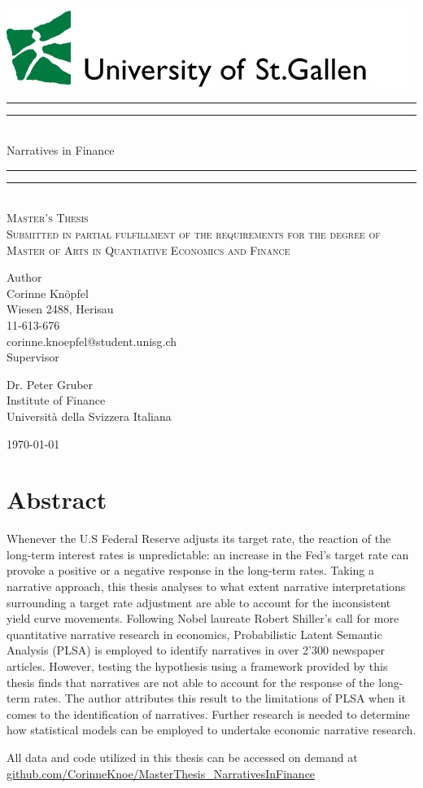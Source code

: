\documentclass[11pt,a4paper,english,oneside]{book}
\makeatletter
\newcommand{\githubSymbol}{\faGithub}
\newcommand\link[2]{\color{black}\href{#1}{#2}\color{black} }
\newcommand*{\github}[1]{\sociallink{\githubSymbol}{https://www.github.com/#1}{github.com/#1}}
\newcommand{\sociallink}[3]{\mbox{\textcolor{black}{#1}\hspace{0.5em}\link{#2}{#3}\hspace{1em}}}
\newcommand*{\plogo}{\includegraphics[scale=0.7]{Images/HSG_logo}}
\numberwithin{equation}{chapter}
\newcommand*{\titleGP}{\begingroup %
\centering %
\vspace*{\baselineskip} %
\plogo\\[2\baselineskip] %
\rule{\textwidth}{1.6pt}\vspace*{-\baselineskip}\vspace*{2pt} %
\rule{\textwidth}{0.4pt}\\[\baselineskip] %
{\LARGE Narratives in Finance }\\[0.2\baselineskip] %
\rule{\textwidth}{0.4pt}\vspace*{-\baselineskip}\vspace{3.2pt} %
\rule{\textwidth}{1.6pt}\\[2\baselineskip] %
\scshape %
Master's Thesis\\[2\baselineskip]
Submitted in partial fulfillment of the requirements for the degree of Master of Arts in Quantiative Economics and Finance \par
\vspace*{2\baselineskip}
Author\\
{\Large Corinne Knöpfel \\ [5pt]
 }
Wiesen 2488, Herisau \\[5pt]
11-613-676\\[5pt]
corinne.knoepfel@student.unisg.ch \\


\vspace*{2\baselineskip}
Supervisor\\
{\Large Dr. Peter Gruber\\[5pt]%
\small Institute of Finance\\[5pt]Universit\`{a} della Svizzera Italiana\par}
\vfill
{\scshape %
	\today } \\[0.3\baselineskip]
\endgroup}
\makeatother
\begin{document}
\thispagestyle{empty}
\titleGP
\newpage
\doublespacing
\setcounter{page}{1}
\thispagestyle{firststyle}


\chapter*{Abstract}
Whenever the U.S Federal Reserve adjusts its target rate, the reaction of the long-term interest rates is unpredictable: an increase in the Fed's target rate can provoke a positive or a negative response in the long-term rates. Taking a narrative approach, this thesis analyses to what extent narrative interpretations surrounding a target rate adjustment are able to account for the inconsistent yield curve movements. 
Following Nobel laureate Robert Shiller's call for more quantitative narrative research in economics, Probabilistic Latent Semantic Analysis (PLSA) is employed to identify narratives in over 2'300 newspaper articles. However, testing the hypothesis using a framework provided by \citet{Ellingsen.2003} this thesis finds that narratives are not able to account for the response of the long-term rates. The author attributes this result to the limitations of PLSA when it comes to the identification of narratives. Further research is needed to determine how statistical models can be employed to undertake economic narrative research. 

\vspace*{\fill}

All data and code utilized in this thesis can be accessed on demand at\\
\noindent \github{CorinneKnoe/MasterThesis\_NarrativesInFinance}



{\pagestyle{firststyle}
\tableofcontents
\cleardoublepage
}

\listoffigures
\listoftables

\newpage


\end{document}
